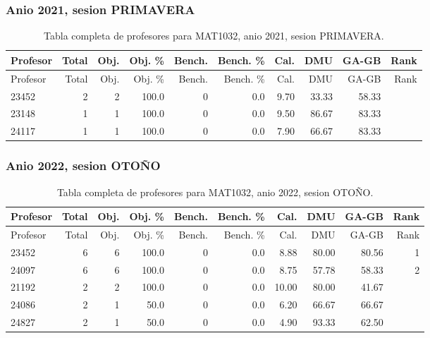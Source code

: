 \subsubsection{Anio 2021, sesion PRIMAVERA}

\begingroup
\scriptsize
\setlength{\tabcolsep}{3pt}
\begin{longtable}{lrrrrrrrrr}
\caption{Tabla completa de profesores para MAT1032, anio 2021, sesion PRIMAVERA.}\label{tab:prof-period-mat1032-2021-primavera}\\
\toprule
Profesor & Total & Obj. & Obj. \% & Bench. & Bench. \% & Cal. & DMU & GA-GB & Rank \\
\midrule
\endfirsthead
\toprule
Profesor & Total & Obj. & Obj. \% & Bench. & Bench. \% & Cal. & DMU & GA-GB & Rank \\
\midrule
\endhead
23452 & 2 & 2 & 100.0 & 0 & 0.0 & 9.70 & 33.33 & 58.33 &  \\
23148 & 1 & 1 & 100.0 & 0 & 0.0 & 9.50 & 86.67 & 83.33 &  \\
24117 & 1 & 1 & 100.0 & 0 & 0.0 & 7.90 & 66.67 & 83.33 &  \\
\bottomrule
\end{longtable}
\endgroup

\subsubsection{Anio 2022, sesion OTOÑO}

\begingroup
\scriptsize
\setlength{\tabcolsep}{3pt}
\begin{longtable}{lrrrrrrrrr}
\caption{Tabla completa de profesores para MAT1032, anio 2022, sesion OTOÑO.}\label{tab:prof-period-mat1032-2022-oto-o}\\
\toprule
Profesor & Total & Obj. & Obj. \% & Bench. & Bench. \% & Cal. & DMU & GA-GB & Rank \\
\midrule
\endfirsthead
\toprule
Profesor & Total & Obj. & Obj. \% & Bench. & Bench. \% & Cal. & DMU & GA-GB & Rank \\
\midrule
\endhead
23452 & 6 & 6 & 100.0 & 0 & 0.0 & 8.88 & 80.00 & 80.56 & 1 \\
24097 & 6 & 6 & 100.0 & 0 & 0.0 & 8.75 & 57.78 & 58.33 & 2 \\
21192 & 2 & 2 & 100.0 & 0 & 0.0 & 10.00 & 80.00 & 41.67 &  \\
24086 & 2 & 1 & 50.0 & 0 & 0.0 & 6.20 & 66.67 & 66.67 &  \\
24827 & 2 & 1 & 50.0 & 0 & 0.0 & 4.90 & 93.33 & 62.50 &  \\
\bottomrule
\end{longtable}
\endgroup

